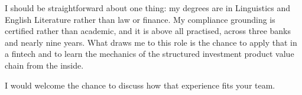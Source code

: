 \documentclass[11pt,a4paper,sans]{moderncv}
\begin{document}
I should be straightforward about one thing: my degrees are in Linguistics and
English Literature rather than law or finance. My compliance grounding is
certified rather than academic, and it is above all practised, across three
banks and nearly nine years. What draws me to this role is the chance to apply
that in a fintech and to learn the mechanics of the structured investment
product value chain from the inside.

I would welcome the chance to discuss how that experience fits your team.

\makeletterclosing
\end{document}
